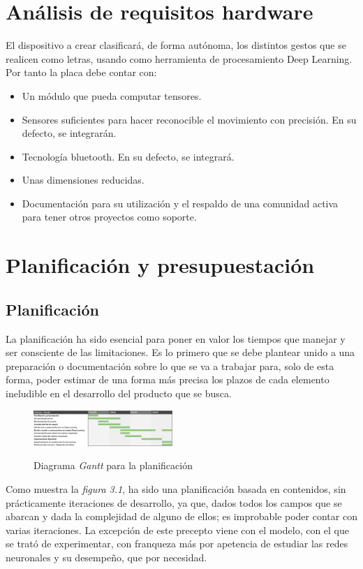 \section{Análisis de requisitos hardware\label{reqHW}}
El dispositivo a crear clasificará, de forma autónoma, los distintos
gestos que se realicen
como letras, usando como herramienta de procesamiento Deep Learning.
Por tanto la placa debe contar con:
\begin{itemize}
    \itemsep0em 
    \item Un módulo que pueda computar tensores.
    \item Sensores suficientes para hacer
    reconocible el movimiento con precisión. En su defecto, se integrarán.
    \item Tecnología bluetooth. En su defecto, se integrará.
    \item Unas dimensiones reducidas.
    \item Documentación para su utilización y el respaldo de una comunidad
    activa para tener otros proyectos como soporte.
\end{itemize}

\section{Planificación y presupuestación}
\subsection{Planificación}
La planificación ha sido esencial para poner en valor los tiempos que manejar
y ser consciente de las limitaciones.
Es lo primero que se debe plantear unido a una preparación o documentación
sobre lo que se va a trabajar para, solo de esta forma, poder estimar de una
forma más precisa los plazos de cada elemento ineludible en el desarrollo
del producto que se busca.
\begin{figure}[]
    \centering
    \includegraphics[angle=270,width=0.47\textwidth]{capturas/ganttFixed.png}\\[-0,20cm]
    \caption{Diagrama \textit{Gantt} para la planificación}
\end{figure}

Como muestra la \textit{figura 3.1}, ha sido una planificación basada en contenidos, sin prácticamente iteraciones
de desarrollo, ya que, dados todos los campos que se abarcan
y dada la complejidad de alguno de ellos; es improbable poder
contar con varias iteraciones. La excepción de este precepto viene
con el modelo, con el que se trató de experimentar, con franqueza más
por apetencia de estudiar las redes neuronales y su desempeño, que por
necesidad.

